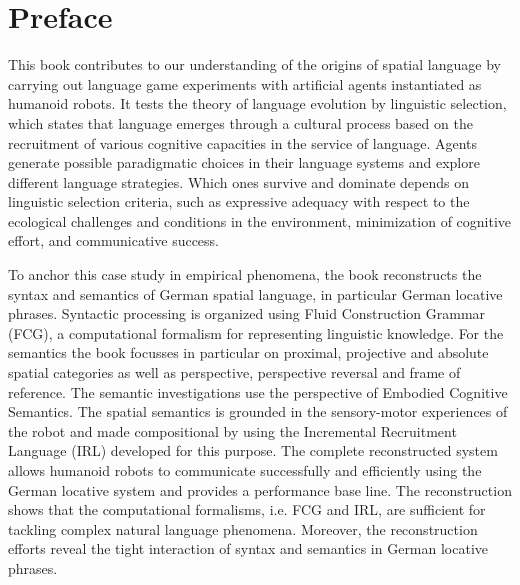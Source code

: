 \chapter*{Preface}

This book contributes to our understanding of the origins of spatial language
by carrying out language game experiments with artificial agents instantiated as
humanoid robots. It tests the theory of language evolution by linguistic selection,
which states that language emerges through a cultural process based on the recruitment of
various cognitive capacities in the service of language. Agents generate possible
paradigmatic choices in their language systems and explore different language strategies.
Which ones survive and dominate depends on linguistic selection criteria, such
as expressive adequacy with respect to the ecological challenges and conditions in the
environment, minimization of cognitive effort, and communicative success.

To anchor this case study in empirical phenomena,
the book reconstructs the syntax and semantics of German spatial language,
in particular German locative phrases. 
Syntactic processing is organized using Fluid Construction Grammar (FCG), 
a computational formalism for representing
linguistic knowledge. For the semantics the book focusses in particular
on proximal, projective and absolute spatial categories as well as perspective,
perspective reversal and frame of reference. The semantic investigations
use the perspective of Embodied Cognitive Semantics.
The spatial semantics is grounded in the sensory-motor experiences of the robot
and made compositional by using the Incremental Recruitment Language (IRL) developed
for this purpose. The complete reconstructed system allows humanoid robots to communicate successfully and efficiently using the German locative system and 
provides a performance base line. The reconstruction shows that the computational
formalisms, i.e. FCG and IRL, are sufficient for tackling complex natural language phenomena.
Moreover, the reconstruction efforts reveal the tight interaction of syntax and semantics 
in German locative phrases. 

